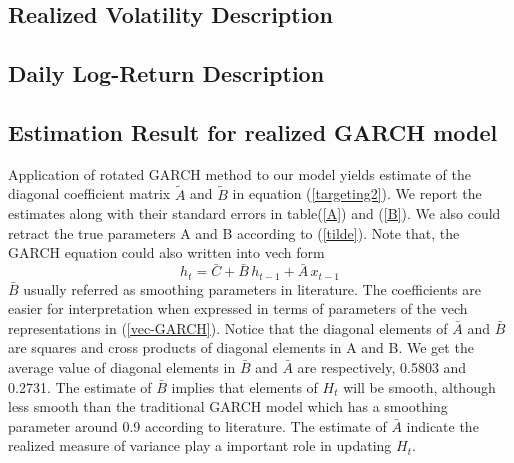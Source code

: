 \documentclass[titlepage,11pt]{article}
\begin{document}
\subsection{Realized Volatility Description}
\subsection{Daily Log-Return Description}
\subsection{Estimation Result for realized GARCH model}

Application of rotated GARCH method to our model yields estimate of the diagonal coefficient matrix $\tilde{A}$ and  $\tilde{B}$ in equation (\ref{targeting2}). We report the estimates along with their standard errors in table(\ref{A}) and (\ref{B}). We also could retract the true parameters A and B according to (\ref{tilde}). 
Note that, the GARCH equation could also written into vech form 
\begin{equation}
\label{vec-GARCH}
h_t= \bar{C} + \bar{B} \,   h_{t-1}+ \bar{A} \,   x_{t-1}
\end{equation}
$\bar{B}$ usually referred as smoothing parameters in literature.
The coefficients are easier for interpretation when expressed in terms of parameters of the vech representations in (\ref{vec-GARCH}). Notice that the diagonal elements of $\bar{A}$ and $\bar{B}$ are squares and cross products of diagonal elements in A and B. We get the average value of diagonal elements in $\bar{B}$ and $\bar{A}$  are respectively,  0.5803 and 0.2731. The estimate of $\bar{B}$ implies that elements of $H_t$ will be smooth, although less smooth than the traditional GARCH model which has a smoothing parameter around 0.9 according to literature. The estimate of $\bar{A}$ indicate the realized measure of variance play a important role in updating $H_t$.
\end{document}

